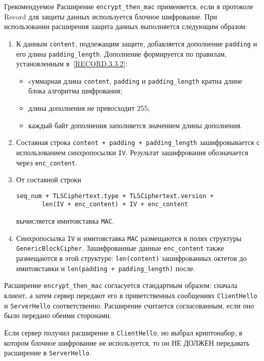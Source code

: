 \begin{appendix}{Г}{рекомендуемое}
Расширение \lstinline{encrypt_then_mac} применяется, если в протоколе Record 
для защиты данных используется блочное шифрование. При использовании 
расширения защита данных выполняется следующим образом:
\begin{enumerate}
\item
К данным \lstinline{content}, подлежащим защите, добавляется дополнение
\lstinline{padding} и его длина \lstinline{padding_length}. 
Дополнение формируется по правилам, установленным в~\ref{RECORD.3.3.2}:
\begin{itemize}
\item
cуммарная длина \lstinline{content}, \lstinline{padding} и 
\lstinline{padding_length} кратна длине блока алгоритма шифрования;
\item
длина дополнения не превосходит 255;
\item
каждый байт дополнения заполняется значением длины дополнения.
\end{itemize}

\item
Составная строка \lstinline{content + padding + padding_length} зашифровывается
с использованием синхропосылки \lstinline{IV}. Результат зашифрования
обозначается через \lstinline{enc_content}.

\item
От составной строки 
\begin{lstlisting}
seq_num + TLSCiphertext.type + TLSCiphertext.version +
       len(IV + enc_content) + IV + enc_content
\end{lstlisting}
вычисляется имитовставка \lstinline{MAC}.

\item
Синхропосылка \lstinline{IV} и имитовставка \lstinline{MAC} размещаются в полях 
структуры \lstinline{GenericBlockCipher}. Зашифрованные данные 
\lstinline{enc_content} также размещаются в этой структуре:
\lstinline{len(content)} зашифрованных октетов до имитовставки и 
\lstinline{len(padding + padding_length)} после.
\end{enumerate}

Расширение \lstinline{encrypt_then_mac} согласуется стандартным образом:
сначала клиент, а затем сервер передают его в приветственных сообщениях
\lstinline{ClientHello} и \lstinline{ServerHello} соответственно. Расширение 
считается согласованным, если оно было передано обеими сторонами.

Если сервер получил расширение в \lstinline{ClientHello}, но выбрал криптонабор,
в котором блочное шифрование не используется, то он НЕ ДОЛЖЕН передавать
расширение в \lstinline{ServerHello}.


\end{appendix}
